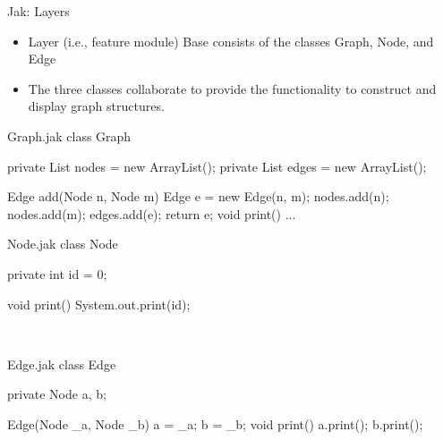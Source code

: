 \begin{frame}[fragile]{Jak: Layers}
	\begin{mycolumns}[widths={60,40},animation=none]
		\begin{example}{}
			\begin{itemize}
				\item Layer (i.e., feature module) Base consists of the classes Graph, Node, and Edge 
				\item The three classes collaborate to provide the functionality to construct and display graph structures.
			\end{itemize}
		\end{example}
	\mynextcolumn
		\vspace{-1.5cm}\begin{flushright}\end{flushright}
	\end{mycolumns}
	\begin{mycolumns}[columns=3,widths={43,27,30},animation=none]
\begin{codetight}{Graph.jak}
class Graph {
	private List nodes = new ArrayList();
	private List edges = new ArrayList();
	
	Edge add(Node n, Node m) {
		Edge e = new Edge(n, m);
		nodes.add(n); nodes.add(m); edges.add(e);
		return e;
	}
	void print() { ... }
}
\end{codetight}		
	\mynextcolumn
\begin{codetight}{Node.jak}
class Node {
	private int id = 0;

	void print() {
		System.out.print(id);
	}
}
~
~
~
~
~
\end{codetight}
	\mynextcolumn
\begin{codetight}{Edge.jak}
class Edge {
	private Node a, b;
	
	Edge(Node _a, Node _b) {
		a = _a; b = _b;
	}
	void print() {
		a.print(); b.print();
	}
}
~
~
\end{codetight}			
	\end{mycolumns}
\end{frame}

